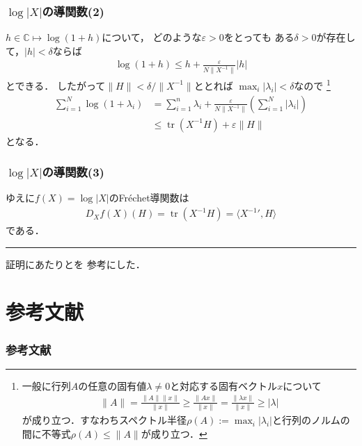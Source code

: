 \documentclass[10pt,%
hyperref={unicode}]{beamer}
\DeclareMathOperator*{\tr}{tr}
\begin{document}
\begin{frame}
    \frametitle{$\log |X|$の導関数(2)}
    $h \in \mathbb{C} \mapsto \log (1 + h)$について，
    どのような$\varepsilon > 0$をとっても
    ある$\delta > 0$が存在して，$|h| < \delta$ならば
    \begin{align*}
        \log (1 + h) \leq h + \frac{\varepsilon}{N\|X^{-1}\|} |h|
    \end{align*}
    とできる．
    したがって$\|H\| < \delta /\|X^{-1}\|$ととれば
    $\max_i |\lambda_i| < \delta$なので
    \footnote{一般に行列$A$の任意の固有値$\lambda \neq 0$と対応する固有ベクトル$x$について
    \begin{align*}
        \|A\| = \frac{\|A\|\|x\|}{\|x\|} \geq \frac{\|Ax\|}{\|x\|} = \frac{\|\lambda x\|}{\|x\|} \geq |\lambda|
    \end{align*}
    が成り立つ．すなわちスペクトル半径$\rho(A) := \max_i |\lambda_i|$と行列のノルムの間に不等式$\rho(A) \leq \|A\|$が成り立つ．}
    \begin{align*}
        \sum_{i = 1}^N \log (1 + \lambda_i) &= \sum_{i = 1}^n \lambda_i + \frac{\varepsilon}{N\|X^{-1}\|} \left(\sum_{i = 1}^N |\lambda_i|\right) \\
                                            &\leq \tr (X^{-1}H) + \varepsilon \|H\|
    \end{align*}
    となる．
\end{frame}

\begin{frame}
    \frametitle{$\log |X|$の導関数(3)}
    ゆえに$f(X) = \log |X|$のFréchet導関数は
    \begin{align*}
        D_{X}f(X)(H) = \tr(X^{-1}H) = \langle X^{-1}{}',H\rangle
    \end{align*}
    である．\hfill\rule{5pt}{10pt}

    \bigskip

    証明にあたり\cite{mantonsblog}と\cite{manton2012}を
    参考にした．
\end{frame}


\section{参考文献}
\begin{frame}
    \frametitle{参考文献}
    
    
\end{frame}
\end{document}
